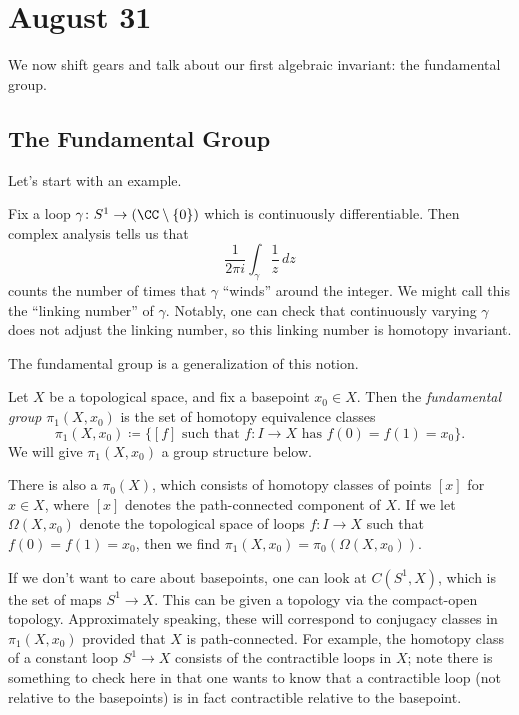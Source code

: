 \documentclass[../notes.tex]{subfiles}
\begin{document}
\section{August 31}

We now shift gears and talk about our first algebraic invariant: the fundamental group.

\subsection{The Fundamental Group}
Let's start with an example.
\begin{example}
	Fix a loop $\gamma\colon S^1\to(\CC\setminus\{0\})$ which is continuously differentiable. Then complex analysis tells us that
	\[\frac1{2\pi i}\int_\gamma\frac1z\,dz\]
	counts the number of times that $\gamma$ ``winds'' around the integer. We might call this the ``linking number'' of $\gamma$. Notably, one can check that continuously varying $\gamma$ does not adjust the linking number, so this linking number is homotopy invariant.
\end{example}
The fundamental group is a generalization of this notion.
\begin{definition}
	Let $X$ be a topological space, and fix a basepoint $x_0\in X$. Then the \textit{fundamental group} $\pi_1(X,x_0)$ is the set of homotopy equivalence classes
	\[\pi_1(X,x_0)\coloneqq\{[f]\text{ such that }f\colon I\to X\text{ has }f(0)=f(1)=x_0\}.\]
	We will give $\pi_1(X,x_0)$ a group structure below.
\end{definition}
\begin{remark}
	There is also a $\pi_0(X)$, which consists of homotopy classes of points $[x]$ for $x\in X$, where $[x]$ denotes the path-connected component of $X$. If we let $\Omega(X,x_0)$ denote the topological space of loops $f\colon I\to X$ such that $f(0)=f(1)=x_0$, then we find $\pi_1(X,x_0)=\pi_0(\Omega(X,x_0))$.
\end{remark}
\begin{remark}
	If we don't want to care about basepoints, one can look at $C\left(S^1,X\right)$, which is the set of maps $S^1\to X$. This can be given a topology via the compact-open topology. Approximately speaking, these will correspond to conjugacy classes in $\pi_1(X,x_0)$ provided that $X$ is path-connected. For example, the homotopy class of a constant loop $S^1\to X$ consists of the contractible loops in $X$; note there is something to check here in that one wants to know that a contractible loop (not relative to the basepoints) is in fact contractible relative to the basepoint.
\end{remark}
\end{document}
